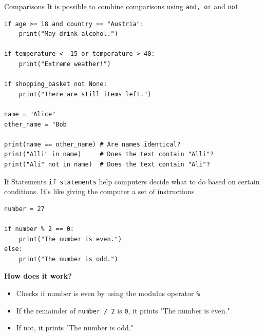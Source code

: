 \documentclass[
	11pt, 
]{beamer}
\begin{document}

\begin{frame}[fragile]{Comparisons}
It is possible to combine comparisons using \texttt{and, or} and \texttt{not}

\begin{verbatim}
if age >= 18 and country == "Austria":
    print("May drink alcohol.")

if temperature < -15 or temperature > 40:
    print("Extreme weather!")

if shopping_basket not None:
    print("There are still items left.")

name = "Alice"
other_name = "Bob

print(name == other_name) # Are names identical?
print("Alli" in name)     # Does the text contain "Alli"?
print("Ali" not in name)  # Does the text contain "Ali"?
\end{verbatim}

\end{frame}


\begin{frame}[fragile]{If Statements}
\texttt{if statements} help computers decide what to do based on certain conditions. It's like giving the computer a set of instructions

\begin{verbatim}
number = 27 

if number % 2 == 0:
    print("The number is even.")
else:
    print("The number is odd.")

\end{verbatim}

\begin{exampleblock}{\textbf{How does it work?}}
\begin{itemize}

    \item Checks if number is even by using the modulus operator \texttt{\%}
    \item If the remainder of \texttt{number / 2} is \texttt{0}, it prints "The number is even."
    \item If not, it prints "The number is odd."
\end{itemize}
\end{exampleblock}

\end{frame}
\end{document}

